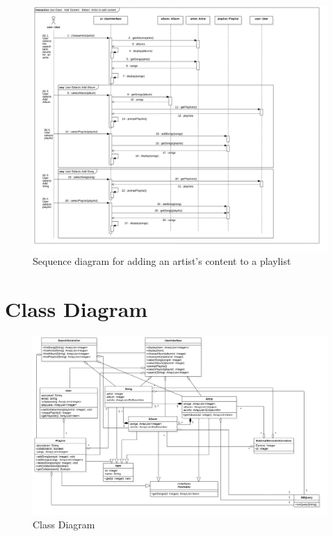 \documentclass[12pt]{article}
\begin{document}
	\begin{figure}[H]
		\centering
		\includegraphics[scale=0.35]{UseCaseAddArtist.png}
		\caption{Sequence diagram for adding an artist's content to a playlist}
		\label{fig:sequenceArtist}
	\end{figure}
	\section{Class Diagram}
	\begin{figure}[H]
		\centering
		\includegraphics[scale=0.35]{MusicManagerClassDiagram.png}
		\caption{Class Diagram}
		\label{fig:classDiag}
	\end{figure}
	
\end{document}
